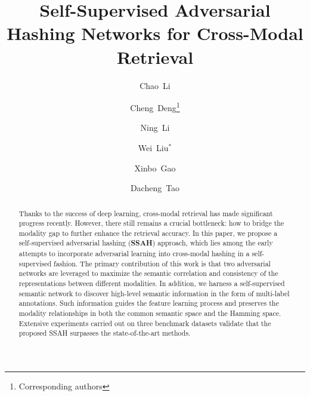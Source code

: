 \documentclass[10pt,twocolumn,letterpaper]{article}
\begin{document}

\title{Self-Supervised Adversarial Hashing Networks for Cross-Modal Retrieval}
\author[1]{Chao~Li}
\author[1]{Cheng~Deng\thanks{Corresponding authors}}
\author[1]{Ning~Li}
\author[2]{Wei~Liu$^{*}$}
\author[1]{Xinbo~Gao}
\author[3]{Dacheng~Tao}
\maketitle
\thispagestyle{empty}
\begin{abstract}
Thanks to the success of deep learning, cross-modal retrieval has made significant progress recently. However, there still remains a crucial bottleneck: how to bridge the modality gap to further enhance the retrieval accuracy. In this paper, we propose a self-supervised adversarial hashing (\textbf{SSAH}) approach, which lies among the early attempts to incorporate adversarial learning into cross-modal hashing in a self-supervised fashion. The primary contribution of this work is that two adversarial networks are leveraged to maximize the semantic correlation and consistency of the representations between different modalities. In addition, we harness a self-supervised semantic network to discover high-level semantic information in the form of multi-label annotations. Such information guides the feature learning process and preserves the modality relationships in both the common semantic space and the Hamming space. Extensive experiments carried out on three benchmark datasets validate that the proposed SSAH surpasses the state-of-the-art methods.
\vspace{-0.5cm}
\end{abstract}
\end{document}
